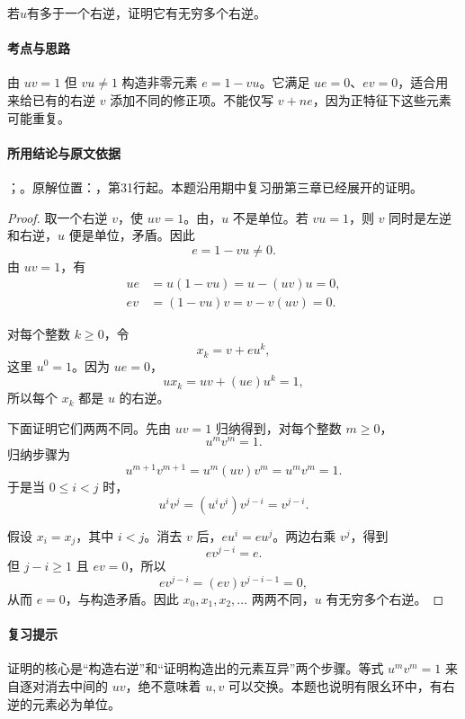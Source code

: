 若$u$有多于一个右逆，证明它有无穷多个右逆。

\paragraph{考点与思路}

由 $uv=1$ 但 $vu\ne1$ 构造非零元素 $e=1-vu$。它满足 $ue=0$、$ev=0$，适合用来给已有的右逆 $v$ 添加不同的修正项。不能仅写 $v+ne$，因为正特征下这些元素可能重复。

\paragraph{所用结论与原文依据}

；。原解位置：，第31行起。本题沿用期中复习册第三章已经展开的证明。


\begin{proof}

取一个右逆 $v$，使 $uv=1$。由，$u$ 不是单位。若 $vu=1$，则 $v$ 同时是左逆和右逆，$u$ 便是单位，矛盾。因此
\[
e=1-vu\ne0.
\]
由 $uv=1$，有
\begin{align*}
ue&=u(1-vu)=u-(uv)u=0,\\
ev&=(1-vu)v=v-v(uv)=0.
\end{align*}

对每个整数 $k\ge0$，令
\[
x_k=v+eu^k,
\]
这里 $u^0=1$。因为 $ue=0$，
\[
ux_k=uv+(ue)u^k=1,
\]
所以每个 $x_k$ 都是 $u$ 的右逆。

下面证明它们两两不同。先由 $uv=1$ 归纳得到，对每个整数 $m\ge0$，
\[
u^mv^m=1.
\]
归纳步骤为
\[
u^{m+1}v^{m+1}=u^m(uv)v^m=u^mv^m=1.
\]
于是当 $0\le i<j$ 时，
\[
u^iv^j=(u^iv^i)v^{j-i}=v^{j-i}.
\]

假设 $x_i=x_j$，其中 $i<j$。消去 $v$ 后，$eu^i=eu^j$。两边右乘 $v^j$，得到
\[
ev^{j-i}=e.
\]
但 $j-i\ge1$ 且 $ev=0$，所以
\[
ev^{j-i}=(ev)v^{j-i-1}=0,
\]
从而 $e=0$，与构造矛盾。因此 $x_0,x_1,x_2,\ldots$ 两两不同，$u$ 有无穷多个右逆。

\end{proof}

\paragraph{复习提示}

证明的核心是“构造右逆”和“证明构造出的元素互异”两个步骤。等式 $u^mv^m=1$ 来自逐对消去中间的 $uv$，绝不意味着 $u,v$ 可以交换。本题也说明有限幺环中，有右逆的元素必为单位。




